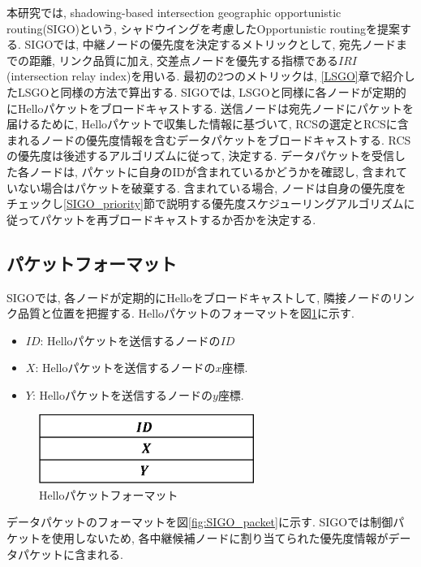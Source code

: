 \documentclass[10pt]{jreport}
\begin{document}
本研究では, shadowing-based intersection geographic opportunistic routing(SIGO)という, シャドウイングを考慮したOpportunistic routingを提案する. SIGOでは, 中継ノードの優先度を決定するメトリックとして, 宛先ノードまでの距離, リンク品質に加え, 交差点ノードを優先する指標である$IRI$(intersection relay index)を用いる. 最初の2つのメトリックは, \ref{LSGO}章で紹介したLSGOと同様の方法で算出する. SIGOでは, LSGOと同様に各ノードが定期的にHelloパケットをブロードキャストする. 送信ノードは宛先ノードにパケットを届けるために, Helloパケットで収集した情報に基づいて, RCSの選定とRCSに含まれるノードの優先度情報を含むデータパケットをブロードキャストする. RCSの優先度は後述するアルゴリズムに従って, 決定する. データパケットを受信した各ノードは, パケットに自身のIDが含まれているかどうかを確認し, 含まれていない場合はパケットを破棄する. 含まれている場合, ノードは自身の優先度をチェックし\ref{SIGO_priority}節で説明する優先度スケジューリングアルゴリズムに従ってパケットを再ブロードキャストするか否かを決定する.

\subsection{パケットフォーマット}

SIGOでは, 各ノードが定期的にHelloをブロードキャストして, 隣接ノードのリンク品質と位置を把握する. Helloパケットのフォーマットを図\ref{fig:hello_packet}に示す.

\begin{itemize}
	\item $ID$: Helloパケットを送信するノードの$ID$
	\item $X$: Helloパケットを送信するノードの$x$座標.
	\item $Y$: Helloパケットを送信するノードの$y$座標.
\end{itemize}


\begin{figure}[!ht]
	\centering
	\includegraphics[width=70mm]{figures/hello_packet_format.eps}
	\caption{Helloパケットフォーマット}
	\label{fig:hello_packet}
\end{figure}

データパケットのフォーマットを図\ref{fig:SIGO_packet}に示す. SIGOでは制御パケットを使用しないため, 各中継候補ノードに割り当てられた優先度情報がデータパケットに含まれる.
\end{document}
